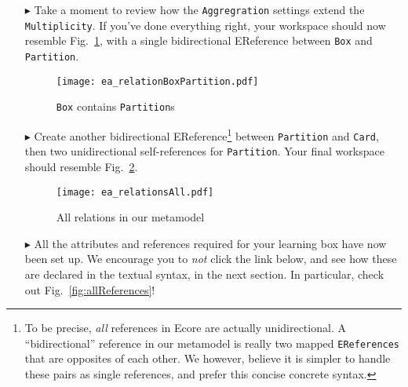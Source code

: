 \begin{itemize}

\item[$\blacktriangleright$] Take a moment to review how the \texttt{Aggregration} settings extend the \texttt{Multiplicity}. If you've done everything right,
your workspace should now resemble Fig.~\ref{fig:ereference_completed}, with a single bidirectional EReference between \texttt{Box} and \texttt{Partition}.

\vspace{1cm}

\begin{figure}[htbp]
	\centering
  \texttt{[image: ea\_relationBoxPartition.pdf]}
	\caption{\texttt{Box} contains \texttt{Partition}s}
	\label{fig:ereference_completed}
\end{figure}
\FloatBarrier

\clearpage
\item[$\blacktriangleright$] Create another bidirectional EReference\footnote{To be precise, \emph{all} references in Ecore are actually unidirectional.
A ``bidirectional'' reference in our metamodel is really two mapped \texttt{EReferences} that are opposites of each other.
We however, believe it is simpler to handle these pairs as single references, and prefer this concise concrete syntax.} between \texttt{Partition} and
\texttt{Card}, then two unidirectional self-references for \texttt{Partition}. Your final workspace should resemble Fig.~\ref{fig:ereferences_all}.

\vspace{1cm}

\begin{figure}[htbp]
	\centering
  \texttt{[image: ea\_relationsAll.pdf]}
	\caption{All relations in our metamodel}
	\label{fig:ereferences_all}
\end{figure}

\FloatBarrier

\item[$\blacktriangleright$] All the attributes and references required for your learning box have now been set up. We encourage you to \emph{not} click the link below, and
see how these are declared in the textual syntax, in the next section. In particular, check out Fig.~\ref{fig:allReferences}!


\end{itemize}
